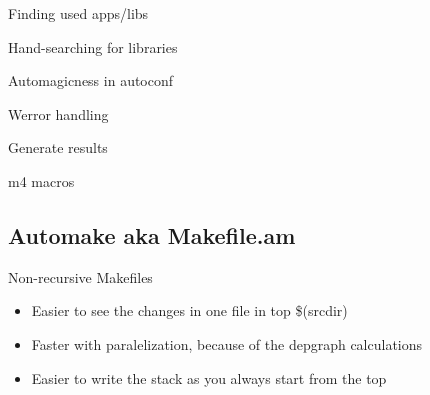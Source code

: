 \documentclass{beamer}
\begin{document}
\begin{frame}[t]{Finding used apps/libs}
	\begin{small}
	
	\end{small}
\end{frame}

\begin{frame}[t]{Hand-searching for libraries}
	\begin{small}
	
	\end{small}
\end{frame}

\begin{frame}[t]{Automagicness in autoconf}
	\begin{small}
	
	\end{small}
\end{frame}

\begin{frame}[t]{Werror handling}
	\begin{small}
	
	\end{small}
\end{frame}

\begin{frame}[t]{Generate results}
	\begin{small}
	
	\end{small}
\end{frame}

\begin{frame}[t]{m4 macros}
	\begin{small}
	
	\end{small}
\end{frame}

\subsection{Automake aka Makefile.am}

\begin{frame}[t]{Non-recursive Makefiles}
	\begin{itemize}
	\item Easier to see the changes in one file in top \$(srcdir)
	\item Faster with paralelization, because of the depgraph calculations
	\item Easier to write the stack as you always start from the top
	\end{itemize}
\end{frame}
\end{document}
